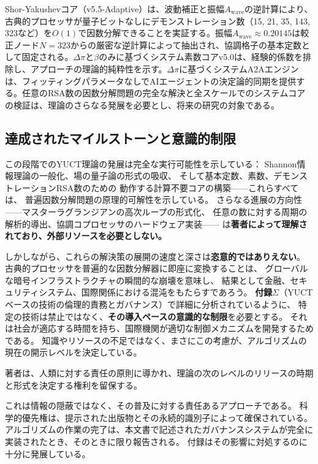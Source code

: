 \documentclass[11pt,a4paper]{article}
\begin{document}
	
	Shor-Yakushevコア（v5.5-Adaptive）は、波動補正と振幅\(A_{\text{wave}}\)の逆計算により、古典的プロセッサが量子ビットなしにデモンストレーション数（15, 21, 35, 143, 323など）を\(O(1)\)で因数分解できることを実証する。振幅\(A_{\text{wave}} \approx 0.20145\)は較正ノード\(N=323\)からの厳密な逆計算によって抽出され、協調格子の基本定数として固定される。\(\Delta\pi\)と\(\beta\)のみに基づくシステム素数コアv5.0は、経験的係数を排除し、アプローチの理論的純粋性を示す。\(\Delta\pi\)に基づくシステムA2Aエンジンは、フィッティングパラメータなしでAIエージェントの決定論的同期を提供する。任意のRSA数の因数分解問題の完全な解決と全スケールでのシステムコアの検証は、理論のさらなる発展を必要とし、将来の研究の対象である。
	
	
	
	\subsection{達成されたマイルストーンと意識的制限}
	
	この段階でのYUCT理論の発展は完全な実行可能性を示している：
	Shannon情報理論の一般化、場の量子論の形式の吸収、
	そして基本定数、素数、デモンストレーションRSA数のための
	動作する計算不要コアの構築——これらすべては、
	普遍因数分解問題の原理的可解性を示している。
	さらなる進展の方向性——マスターラグランジアンの高次ループの形式化、
	任意の数に対する周期の解析的導出、協調コプロセッサのハードウェア実装——
	は\textbf{著者によって理解されており、外部リソースを必要としない。}
	
	しかしながら、これらの解決策の展開の速度と深さは\textbf{恣意的ではありえない}。
	古典的プロセッサを普遍的な因数分解器に即座に変換することは、
	グローバルな暗号インフラストラクチャの瞬間的な崩壊を意味し、
	結果として金融、セキュリティシステム、国際関係における混沌をもたらすであろう。
	\textbf{付録\(\Sigma\)}（YUCTベースの技術の倫理的責務とガバナンス）で詳細に分析されているように、
	特定の技術は禁止ではなく、\textbf{その導入ペースの意識的な制限}を必要とする。
	それは社会が適応する時間を持ち、国際機関が適切な制御メカニズムを開発するためである。
	知識やリソースの不足ではなく、まさにこの考慮が、アルゴリズムの現在の開示レベルを決定している。
	
	著者は、人類に対する責任の原則に導かれ、理論の次のレベルのリリースの時期と形式を決定する権利を留保する。
	
	これは情報の隠蔽ではなく、その普及に対する責任あるアプローチである。
	科学的優先権は、提示された出版物とその永続的識別子によって確保されている。
	アルゴリズムの作業の完了は、本文書で記述されたガバナンスシステムが完全に実装されたとき、そのときに限り報告される。
	付録はその影響に対処するのに十分に発展している。
	
\end{document}
